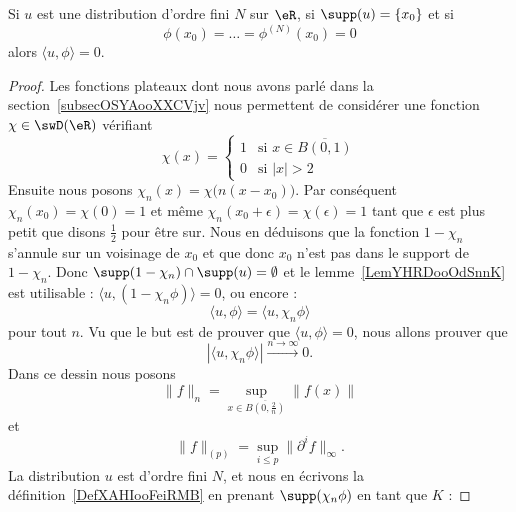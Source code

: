 \begin{lemma}
    Si \( u\) est une distribution d'ordre fini \( N\) sur \( \eR\), si \( \supp(u)=\{ x_0 \}\) et si
    \begin{equation}
        \phi(x_0)=\ldots=\phi^{(N)}(x_0)=0
    \end{equation}
    alors \( \langle u, \phi\rangle =0\).
\end{lemma}

\begin{proof}
    Les fonctions plateaux dont nous avons parlé dans la section~\ref{subsecOSYAooXXCVjv} nous permettent de considérer une fonction \( \chi\in\swD(\eR)\) vérifiant
    \begin{equation}
        \chi(x)=\begin{cases}
            1    &   \text{si } x\in\overline{ B(0,1) }\\
            0    &    \text{si } | x |>2
        \end{cases}
    \end{equation}
    Ensuite nous posons \( \chi_n(x)=\chi\big( n(x-x_0) \big)\). Par conséquent \( \chi_n(x_0)=\chi(0)=1\) et même \( \chi_n(x_0+\epsilon)=\chi(\epsilon)=1\) tant que \( \epsilon\) est plus petit que disons \( \frac{ 1 }{2}\) pour être sur. Nous en déduisons que la fonction \( 1-\chi_n\) s'annule sur un voisinage de \( x_0\) et que donc \( x_0\) n'est pas dans le support de \( 1-\chi_n\). Donc \( \supp(1-\chi_n)\cap\supp(u)=\emptyset\) et le lemme~\ref{LemYHRDooOdSnnK} est utilisable :
        $\langle u, (1-\chi_n\phi)\rangle =0$, ou encore :
        \begin{equation}
            \langle u, \phi\rangle =\langle u, \chi_n\phi\rangle
        \end{equation}
        pour tout \( n\). Vu que le but est de prouver que \( \langle u, \phi\rangle =0\), nous allons prouver que
        \begin{equation}
            | \langle u, \chi_n\phi\rangle  |\stackrel{n\to\infty}{\longrightarrow}0.
        \end{equation}
        Dans ce dessin nous posons
        \begin{equation}
            \| f \|_n=\sup_{x\in\overline{ B(0,\frac{ 2 }{ n })}}\| f(x) \|
        \end{equation}
        et
        \begin{equation}
            \| f \|_{(p)}=\sup_{i\leq p}\| \partial^if \|_{\infty}.
        \end{equation}
        La distribution \( u\) est d'ordre fini \( N\), et nous en écrivons la définition~\ref{DefXAHIooFeiRMB} en prenant \( \supp(\chi_n\phi)\) en tant que \( K\) :

\end{proof}
